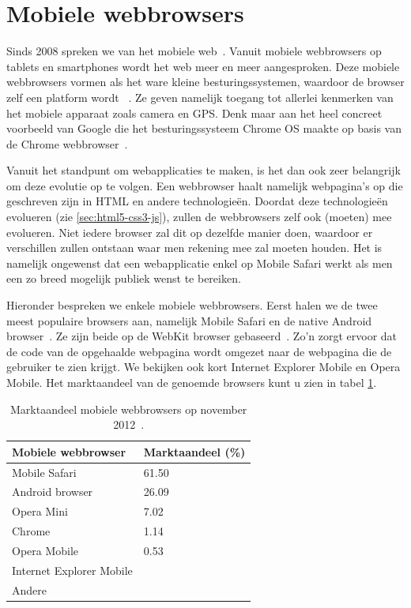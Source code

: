 
\section{Mobiele webbrowsers}
\label{sec:mobiele-webbrowsers}
Sinds 2008 spreken we van het mobiele web~\cite{Hales2012}. Vanuit mobiele webbrowsers op tablets en smartphones wordt het web meer en meer aangesproken. Deze mobiele webbrowsers vormen als het ware kleine besturingssystemen, waardoor de browser zelf een platform wordt ~\cite{Hales2012}. Ze geven namelijk toegang tot allerlei kenmerken van het mobiele apparaat zoals camera en GPS. Denk maar aan het heel concreet voorbeeld van Google die het besturingssysteem Chrome OS maakte op basis van de Chrome webbrowser~\cite{Hales2012}.

Vanuit het standpunt om webapplicaties te maken, is het dan ook zeer belangrijk om deze evolutie op te volgen. Een webbrowser haalt namelijk webpagina's op die geschreven zijn in HTML en andere technologieën. Doordat deze technologieën evolueren (zie \ref{sec:html5-css3-js}), zullen de webbrowsers zelf ook (moeten) mee evolueren. Niet iedere browser zal dit op dezelfde manier doen, waardoor er verschillen zullen ontstaan waar men rekening mee zal moeten houden. Het is namelijk ongewenst dat een webapplicatie enkel op Mobile Safari werkt als men een zo breed mogelijk publiek wenst te bereiken. 

Hieronder bespreken we enkele mobiele webbrowsers. Eerst halen we de twee meest populaire browsers aan, namelijk Mobile Safari en de native Android browser~\cite{Hales2012}. Ze zijn beide op de WebKit browser  gebaseerd~\cite{Oeflman2011}. Zo'n  zorgt ervoor dat de code van de opgehaalde webpagina wordt omgezet naar de webpagina die de gebruiker te zien krijgt. We bekijken ook kort Internet Explorer Mobile en Opera Mobile. Het marktaandeel van de genoemde browsers kunt u zien in tabel \ref{tbl:marktaandeel-browsers}.

\begin{table}
\begin{center}
\begin{tabular}{ll}
\hline
\textbf{Mobiele webbrowser} & \textbf{Marktaandeel} (\%) \\
\hline
\hline
Mobile Safari				& 61.50 \\
Android browser				& 26.09 \\
Opera Mini				& 7.02 	\\
Chrome					& 1.14 	\\
Opera Mobile				& 0.53 	\\
Internet Explorer Mobile & 		\\
Andere					& 		\\
\hline
\end{tabular}
\caption{Marktaandeel mobiele webbrowsers op november 2012~\cite{NetApplications2012}.}
\label{tbl:marktaandeel-browsers}
\end{center}
\end{table}

